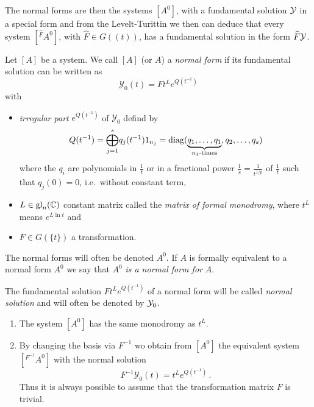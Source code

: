 The normal forms are then the systems $[A^0]$, with a fundamental solution
$\mathcal{Y}$ in a special form and from the Levelt-Turittin we then can deduce that
every system $[{}^{\hat F}\!A^0]$, with $\hat F\in G(\!(t)\!)$, has a
fundamental solution in the form $\widehat F\mathcal{Y}$.
\begin{defn}\label{defn:normSol}
  Let $[A]$ be a system.
  We call $[A]$ (or $A$) a \emph{normal form} if its fundamental solution can
  be written as
  \[
    \mathcal{Y}_0(t)=F t^L e^{Q(t^{-1})}
  \]
  with
  \begin{itemize}
    \item \emph{irregular part} $e^{Q(t^{-1})}$ of $\mathcal{Y}_0$ defind by
      \[
        Q(t^{-1})=\underset{j=1}{\overset{s}{\bigoplus}}q_j(t^{-1})1_{n_j}
          =\diag(\underset{n_1\text{-times}}{\underbrace{%
          q_1,\dots,q_1}},q_2,\dots,q_s)
      \]
      where the $q_i$ are polynomials in $\frac{1}{t}$ or in a fractional power
      $\frac{1}{s}=\frac{1}{t^{1/p}}$ of $\frac{1}{t}$ such that $q_j(0)=0$,
      i.e.\ without constant term,
    \item $L\in\operatorname{gl}_n(\mathbb{C})$ constant matrix called the \emph{matrix of formal
      monodromy}, where $t^L$ means $e^{L\ln t}$ and
    \item $F\in G(\!\{t\}\!)$ a transformation.
  \end{itemize}
  The normal forms will often be denoted $A^0$.
  If $A$ is formally equivalent to a normal form $A^0$ we say that $A^0$
  \emph{is a normal form for} $A$.

  The fundamental solution $F t^L e^{Q(t^{-1})}$ of a normal form will be
  called \emph{normal solution} and will often be denoted by $\mathcal{Y}_0$.
  \begin{s-rem}
    \begin{enumerate}
      \item The system $[A^0]$ has the same monodromy as $t^L$. 
      \item {}
        By changing the basis via $F^{-1}$ wo obtain from $[A^0]$ the
        equivalent system $[{}^{F^{-1}}\!A^0]$ with the normal solution
        \[
          F^{-1}\mathcal{Y}_0(t)=t^L e^{Q(t^{-1})} \,.
        \]
        Thus it is always possible to assume that the transformation matrix
        $F$ is trivial.
    \end{enumerate}
  \end{s-rem}
\end{defn}
